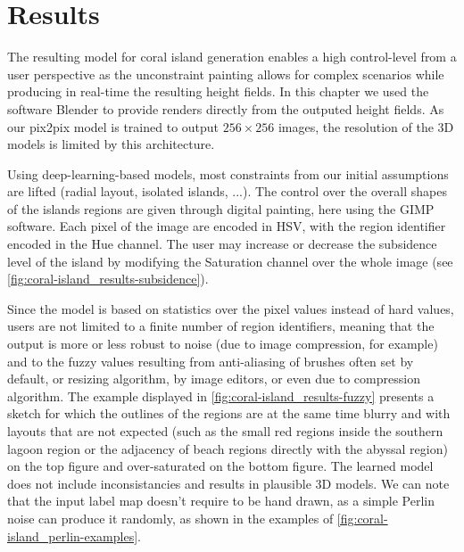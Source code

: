 \section{Results}

The resulting model for coral island generation enables a high control-level from a user perspective as the unconstraint painting allows for complex scenarios while producing in real-time the resulting height fields. In this chapter we used the software Blender to provide renders directly from the outputed height fields. As our pix2pix model is trained to output $256\times256$ images, the resolution of the 3D models is limited by this architecture.


Using deep-learning-based models, most constraints from our initial assumptions are lifted (radial layout, isolated islands, ...). The control over the overall shapes of the islands regions are given through digital painting, here using the GIMP software. Each pixel of the image are encoded in HSV, with the region identifier encoded in the Hue channel. The user may increase or decrease the subsidence level of the island by modifying the Saturation channel over the whole image (see \cref{fig:coral-island_results-subsidence}). 

Since the model is based on statistics over the pixel values instead of hard values, users are not limited to a finite number of region identifiers, meaning that the output is more or less robust to noise (due to image compression, for example) and to the fuzzy values resulting from anti-aliasing of brushes often set by default, or resizing algorithm, by image editors, or even due to compression algorithm. The example displayed in \cref{fig:coral-island_results-fuzzy} presents a sketch for which the outlines of the regions are at the same time blurry and with layouts that are not expected (such as the small red regions inside the southern lagoon region or the adjacency of beach regions directly with the abyssal region) on the top figure and over-saturated on the bottom figure. The learned model does not include inconsistancies and results in plausible 3D models. We can note that the input label map doesn't require to be hand drawn, as a simple Perlin noise can produce it randomly, as shown in the examples of \cref{fig:coral-island_perlin-examples}.

